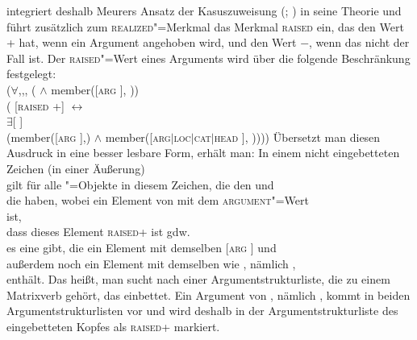\citet{Prze99b} integriert deshalb Meurers Ansatz der Kasuszuweisung (\citeyear{Meurers99b}; \citeyear[Kapitel~10.4.1.4]{Meurers2000b})
in seine Theorie und führt zusätzlich zum \textsc{realized}"=Merkmal
das Merkmal \textsc{raised} ein, das den Wert + hat, wenn ein
Argument angehoben wird, und den Wert $-$, wenn das nicht der Fall ist.
Der \textsc{raised}"=Wert eines Arguments wird über die folgende Beschränkung
festgelegt:
\ea
\label{raised-wert}
 \impl\\
\mbox{}\hspace{3ex}($\forall$,,, (  $\wedge$ member([\textsc{arg}  ], )) \impl\\
\mbox{}\hspace{6ex}( [\textsc{raised} +] $\leftrightarrow$\\
\mbox{}\hspace{9ex}$\exists$[\argst {} ]\\
\mbox{}\hspace{9ex}(member([\textsc{arg}  ],) $\wedge$ member([\textsc{arg$|$loc$|$cat$|$head}  ], ))))
\z
Übersetzt man diesen Ausdruck in eine besser lesbare Form, erhält man:
\ea
In einem nicht eingebetteten Zeichen (\dash in einer Äußerung)\\
\mbox{}\hspace{3ex}gilt für alle "=Objekte in diesem Zeichen, die den \headw {} und\\
\mbox{}\hspace{3ex}die \argst {} haben, wobei  ein Element von  mit dem
     \textsc{argument}"=Wert \\
\mbox{}\hspace{3ex}ist,\\
\mbox{}\hspace{3ex}dass dieses Element  \textsc{raised}+ ist gdw.\ \\
\mbox{}\hspace{6ex}es eine \argstl gibt, die ein Element mit demselben [\textsc{arg}  ] und\\
\mbox{}\hspace{6ex}außerdem noch ein Element mit demselben \headw wie , nämlich ,\\
\mbox{}\hspace{6ex}enthält.
\z
Das heißt, man sucht nach einer Argumentstrukturliste, die zu einem Matrixverb gehört, das
 einbettet. Ein Argument von , nämlich , kommt in beiden Argumentstrukturlisten
vor und wird deshalb in der Argumentstrukturliste des eingebetteten Kopfes als \textsc{raised}+
markiert.

